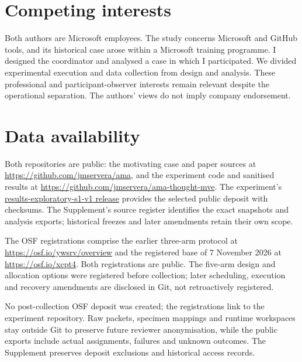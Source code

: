 \documentclass[11pt,a4paper]{article}
\begin{document}
\section*{Competing interests}
Both authors are Microsoft employees. The study concerns Microsoft and
GitHub tools, and its historical case arose within a Microsoft training
programme. I designed the coordinator and analysed a case in which I
participated. We divided experimental execution and data collection from
design and analysis. These professional and
participant-observer interests remain relevant despite the operational
separation. The authors' views do not imply company endorsement.

\section*{Data availability}
Both repositories are public: the motivating case and paper sources at
\url{https://github.com/jmservera/ama}, and the experiment code and sanitised
results at \url{https://github.com/jmservera/ama-thought-mve}.
The experiment's
\href{https://github.com/jmservera/ama-thought-mve/releases/tag/results-exploratory-s1-v1}
{results-exploratory-s1-v1 release}
provides the selected public deposit with checksums.
The Supplement's source register identifies the exact snapshots and
analysis exports; historical freezes and later amendments retain their
own scope.

The OSF registrations comprise the earlier three-arm protocol at
\url{https://osf.io/ywsrv/overview} and the registered base of
7 November 2026 at \url{https://osf.io/xcpt4}.
Both registrations are public.
The five-arm design and allocation options were registered before collection;
later scheduling, execution and recovery amendments are disclosed in Git, not retroactively registered.

No post-collection OSF deposit was created; the registrations link to the
experiment repository. Raw packets, specimen mappings and runtime
workspaces stay outside Git to preserve future reviewer anonymisation,
while the public exports include actual assignments, failures and unknown
outcomes. The Supplement preserves deposit exclusions and historical
access records.
\end{document}

